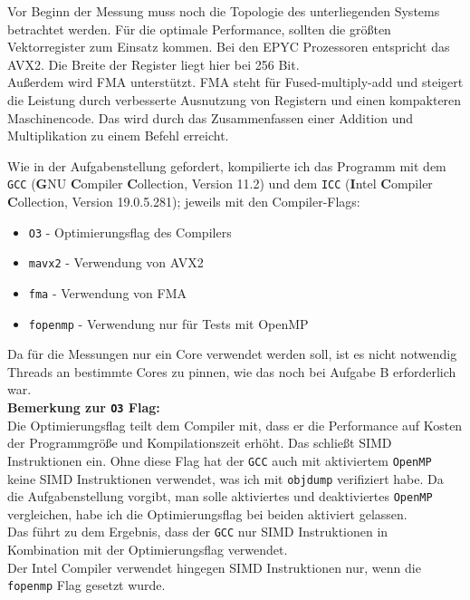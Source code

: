 \documentclass[german,plainarticle,hyperref,utf8]{zihpub}
\begin{document}
	Vor Beginn der Messung muss noch die Topologie des unterliegenden Systems betrachtet werden. Für die optimale Performance, sollten die größten Vektorregister zum Einsatz kommen. Bei den EPYC Prozessoren entspricht das AVX2. Die Breite der Register liegt hier bei 256 Bit.\\
	Außerdem wird FMA unterstützt. FMA steht für Fused-multiply-add und steigert die Leistung durch verbesserte Ausnutzung von Registern und einen kompakteren Maschinencode. Das wird durch das Zusammenfassen einer Addition und Multiplikation zu einem Befehl erreicht.
	
	Wie in der Aufgabenstellung gefordert, kompilierte ich das Programm mit dem \texttt{GCC} (\textbf{G}NU \textbf{C}ompiler \textbf{C}ollection, Version 11.2) und dem \texttt{ICC} (\textbf{I}ntel \textbf{C}ompiler \textbf{C}ollection, Version 19.0.5.281); jeweils mit den Compiler-Flags:
	\begin{itemize}
		\item \texttt{O3} - Optimierungsflag des Compilers
		\item \texttt{mavx2} - Verwendung von AVX2
		\item \texttt{fma} - Verwendung von FMA
		\item \texttt{fopenmp} - Verwendung nur für Tests mit OpenMP
	\end{itemize}
	
	Da für die Messungen nur ein Core verwendet werden soll, ist es nicht notwendig Threads an bestimmte Cores zu pinnen, wie das noch bei Aufgabe B erforderlich war.\\
	
	\textbf{Bemerkung zur \texttt{O3} Flag:}\\
	Die Optimierungsflag teilt dem Compiler mit, dass er die Performance auf Kosten der Programmgröße und Kompilationszeit erhöht. Das schließt SIMD Instruktionen ein. Ohne diese Flag hat der \texttt{GCC} auch mit aktiviertem \texttt{OpenMP} keine SIMD Instruktionen verwendet, was ich mit \texttt{objdump} verifiziert habe. Da die Aufgabenstellung vorgibt, man solle aktiviertes und deaktiviertes \texttt{OpenMP} vergleichen, habe ich die Optimierungsflag bei beiden aktiviert gelassen.\\
	Das führt zu dem Ergebnis, dass der \texttt{GCC} nur SIMD Instruktionen in Kombination mit der Optimierungsflag verwendet.\\
	Der Intel Compiler verwendet hingegen SIMD Instruktionen nur, wenn die \texttt{fopenmp} Flag gesetzt wurde.
	
\end{document}
